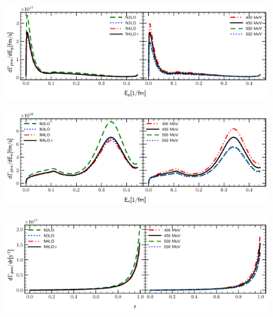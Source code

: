     \begin{figure}[h]
        \begin{center}
        \includegraphics[width=0.9\textwidth]{PlotData/PION/Dalitz_maps/figures/3HE_dGdEp.pdf}
        \end{center}
        \caption{}
        \label{pion_GdEp}
    \end{figure}

    \begin{figure}[h]
        \begin{center}
        \includegraphics[width=0.9\textwidth]{PlotData/PION/Dalitz_maps/figures/3HE_dGdEn.pdf}
        \end{center}
        \caption{}
        \label{pion_dGdEn}
    \end{figure}

    \begin{figure}[h]
        \begin{center}
        \includegraphics[width=0.9\textwidth]{PlotData/PION/Dalitz_maps/figures/3HE_dGdr.pdf}
        \end{center}
        \caption{}
        \label{pion_dGdEr}
    \end{figure}

